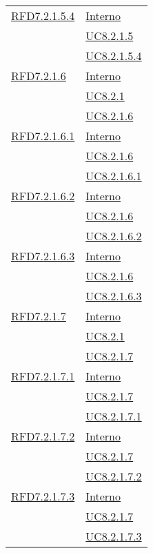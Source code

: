 \begin{longtable}{|>{\centering}m{5cm}|m{5cm}<{\centering}|}
\hyperlink{RFD7.2.1.5.4}{RFD7.2.1.5.4} & \hyperlink{Interno}{Interno}\\
& \hyperref[UC8.2.1.5]{UC8.2.1.5}\\
& \hyperref[UC8.2.1.5.4]{UC8.2.1.5.4}\\ \hline

\hyperlink{RFD7.2.1.6}{RFD7.2.1.6} & \hyperlink{Interno}{Interno}\\
& \hyperref[UC8.2.1]{UC8.2.1}\\
& \hyperref[UC8.2.1.6]{UC8.2.1.6}\\ \hline

\hyperlink{RFD7.2.1.6.1}{RFD7.2.1.6.1} & \hyperlink{Interno}{Interno}\\
& \hyperref[UC8.2.1.6]{UC8.2.1.6}\\
& \hyperref[UC8.2.1.6.1]{UC8.2.1.6.1}\\ \hline

\hyperlink{RFD7.2.1.6.2}{RFD7.2.1.6.2} & \hyperlink{Interno}{Interno}\\
& \hyperref[UC8.2.1.6]{UC8.2.1.6}\\
& \hyperref[UC8.2.1.6.2]{UC8.2.1.6.2}\\ \hline

\hyperlink{RFD7.2.1.6.3}{RFD7.2.1.6.3} & \hyperlink{Interno}{Interno}\\
& \hyperref[UC8.2.1.6]{UC8.2.1.6}\\
& \hyperref[UC8.2.1.6.3]{UC8.2.1.6.3}\\ \hline

\hyperlink{RFD7.2.1.7}{RFD7.2.1.7} & \hyperlink{Interno}{Interno}\\
& \hyperref[UC8.2.1]{UC8.2.1}\\
& \hyperref[UC8.2.1.7]{UC8.2.1.7}\\ \hline

\hyperlink{RFD7.2.1.7.1}{RFD7.2.1.7.1} & \hyperlink{Interno}{Interno}\\
& \hyperref[UC8.2.1.7]{UC8.2.1.7}\\
& \hyperref[UC8.2.1.7.1]{UC8.2.1.7.1}\\ \hline

\hyperlink{RFD7.2.1.7.2}{RFD7.2.1.7.2} & \hyperlink{Interno}{Interno}\\
& \hyperref[UC8.2.1.7]{UC8.2.1.7}\\
& \hyperref[UC8.2.1.7.2]{UC8.2.1.7.2}\\ \hline

\hyperlink{RFD7.2.1.7.3}{RFD7.2.1.7.3} & \hyperlink{Interno}{Interno}\\
& \hyperref[UC8.2.1.7]{UC8.2.1.7}\\
& \hyperref[UC8.2.1.7.3]{UC8.2.1.7.3}\\ \hline


\end{longtable}
